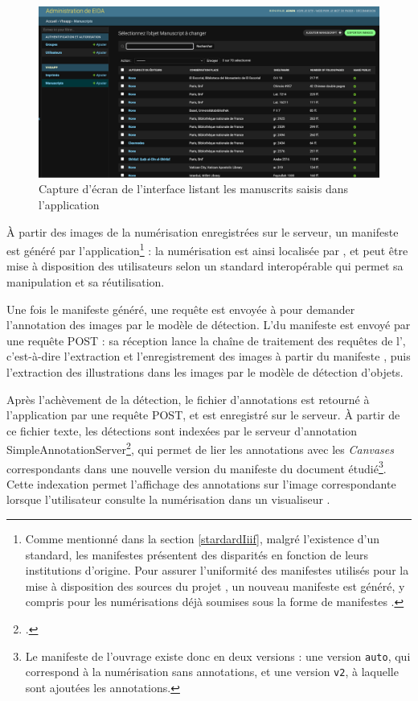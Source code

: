 	\begin{figure}[h]
		\centering
		\includegraphics[width=16cm]{images/eida_list.png}
		\caption{Capture d'écran de l'interface listant les manuscrits saisis dans l'application \eida}
		\label{fig:eida_list}
	\end{figure}

	À partir des images de la numérisation enregistrées sur le serveur, un manifeste \iiif est généré par l'application\footnote{Comme mentionné dans la section \ref{stardardIiif}, malgré l'existence d'un standard, les manifestes \iiif présentent des disparités en fonction de leurs institutions d'origine. Pour assurer l'uniformité des manifestes utilisés pour la mise à disposition des sources du projet \eida, un nouveau manifeste est généré, y compris pour les numérisations déjà soumises sous la forme de manifestes \iiif.} : la numérisation est ainsi localisée par \URL, et peut être mise à disposition des utilisateurs selon un standard interopérable qui permet sa manipulation et sa réutilisation.
	
	Une fois le manifeste \iiif généré, une requête est envoyée à \exapi pour demander l'annotation des images par le modèle de détection. L'\URL du manifeste est envoyé par une requête \http POST : sa réception lance la chaîne de traitement des requêtes de l'\api, c'est-à-dire l'extraction et l'enregistrement des images à partir du manifeste \iiif, puis l'extraction des illustrations dans les images par le modèle de détection d'objets. 
	
	Après l'achèvement de la détection, le fichier d'annotations est retourné à l'application par une requête POST, et est enregistré sur le serveur. À partir de ce fichier texte, les détections sont indexées par le serveur \iiif d'annotation SimpleAnnotationServer\footcite{WelcomeSimpleAnnotation}, qui permet de lier les annotations avec les \textit{Canvases} correspondants dans une nouvelle version du manifeste \iiif du document étudié\footnote{Le manifeste \iiif de l'ouvrage existe donc en deux versions : une version \texttt{auto}, qui correspond à la numérisation sans annotations, et une version \texttt{v2}, à laquelle sont ajoutées les annotations.}. Cette indexation permet l'affichage des annotations sur l'image correspondante lorsque l'utilisateur consulte la numérisation dans un visualiseur \iiif.
	
